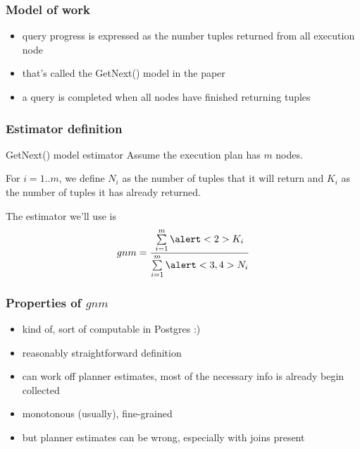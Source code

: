 \documentclass{beamer}
\begin{document}
\begin{frame}
  \frametitle{Model of work}

  \begin{itemize}
  \item query progress is expressed as the number tuples returned from all
    execution node
  \item that's called the GetNext() model in the paper
  \item a query is completed when all nodes have finished returning tuples
  \end{itemize}
\end{frame}

\begin{frame}
  \frametitle{Estimator definition}

  \begin{block}{GetNext() model estimator}
    Assume the execution plan has $m$ nodes.

    \bigskip

    For $i = 1..m$, we define \alert<3>{$N_{i}$} as the number of tuples that
    it \alert<3>{will return} and \alert<2>{$K_{i}$} as the number of tuples it
    \alert<2>{has already returned}.

    \bigskip

    The estimator we'll use is
    \begin{equation*}
      gnm = \frac{\sum\limits_{i=1}^{m} \alert<2>{K_{i}}}
      {\sum\limits_{i=1}^{m} \alert<3,4>{N_{i}}}
    \end{equation*}

    \bigskip

  \end{block}
\end{frame}

\begin{frame}
  \frametitle{Properties of $gnm$}

  \begin{itemize}
  \item kind of, sort of computable in Postgres :)
  \item reasonably straightforward definition
  \item can work off planner estimates, most of the necessary info is already
    begin collected
  \item monotonous (usually), fine-grained
  \item but planner estimates can be wrong, especially with joins present
  \end{itemize}
\end{frame}
\end{document}
